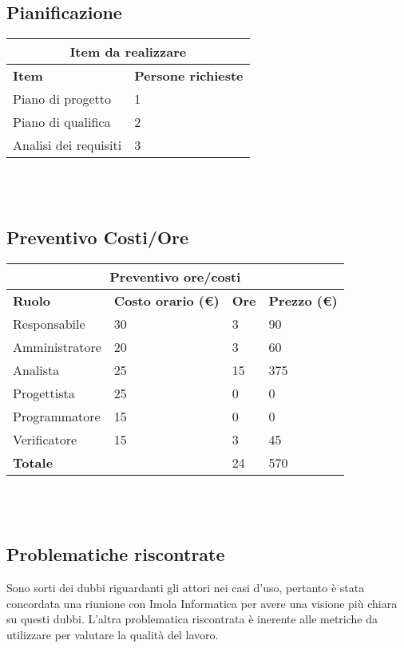 \documentclass[12pt]{article}
\begin{document}
\subsection{Pianificazione}
\begin{center}
    \begin{tabularx}{\textwidth}{|X|X|}
        \hline
        \multicolumn{2}{|c|}{\textbf{Item da realizzare}}\\
        \hline
        \hline
        \textbf{Item} & \textbf{Persone richieste}\\
        \hline
        Piano di progetto & 1\\
        \hline
        Piano di qualifica & 2\\
        \hline
        Analisi dei requisiti & 3 \\
        \hline
    \end{tabularx}\\[8pt]
    \mbox{}\\
\end{center}
\subsection{Preventivo Costi/Ore}
\begin{center}
    \begin{tabularx}{\textwidth}{|X|X|X|X|}
        \hline
        \multicolumn{4}{|c|}{\textbf{Preventivo ore/costi}}\\
        \hline
        \hline
        \textbf{Ruolo} & \textbf{Costo orario (\euro)} & \textbf{Ore} & \textbf{Prezzo (\euro)}\\
        \hline
        Responsabile    & 30 & 3  & 90\\   
        \hline
        Amministratore  & 20 & 3  & 60\\ 
        \hline
        Analista        & 25 & 15  & 375\\ 
        \hline
        Progettista     & 25 & 0  & 0\\
        \hline
        Programmatore   & 15 & 0  & 0\\
        \hline
        Verificatore    & 15 & 3  & 45\\
        \hline
        \hline
        \textbf{Totale} &    & 24 & 570\\
        \hline
    \end{tabularx}\\[8pt]
    \mbox{}\\
\end{center}
\subsection{Problematiche riscontrate}
Sono sorti dei dubbi riguardanti gli attori nei casi d'uso, pertanto è stata concordata una riunione con Imola Informatica per avere una visione più chiara su questi dubbi.
L'altra problematica riscontrata è inerente alle metriche da utilizzare per valutare la qualità del lavoro.
\end{document}
